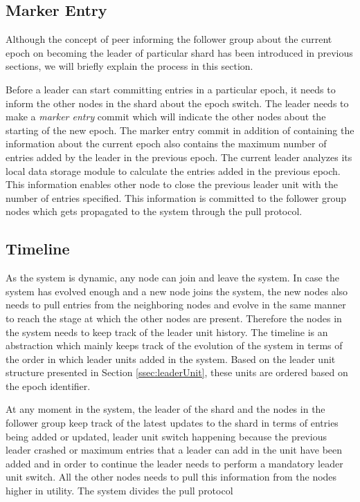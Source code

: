 \documentclass[12pt,a4paper,twoside,openright]{book}
\begin{document}
\subsection{Marker Entry}
Although the concept of peer informing the follower group about the current epoch on becoming the leader of particular shard has been introduced in previous sections, we will briefly explain the process in this section. 

\par Before a leader can start committing entries in a particular epoch, it needs to inform the other nodes in the shard about the epoch switch. The leader needs to make a \textit{marker entry} commit which will indicate the other nodes about the starting of the new epoch. The marker entry commit in addition of containing the information about the current epoch also contains the maximum number of entries added by the leader in the previous epoch. The current leader analyzes its local data storage module to calculate the entries added in the previous epoch. This information enables other node to close the previous leader unit with the number of entries specified. This information is committed to the follower group nodes which gets propagated to the system through the pull protocol.

\subsection{Timeline}
\label{ssec:timeline}
As the system is dynamic, any node can join and leave the system. In case the system has evolved enough and a new node joins the system, the new nodes also needs to pull entries from the neighboring nodes and evolve in the same manner to reach the stage at which the other nodes are present. Therefore the nodes in the system needs to keep track of the leader unit history. The timeline is an abstraction which mainly keeps track of the evolution of the system in terms of the order in which leader units added in the system. Based on the leader unit structure presented in Section \ref{ssec:leaderUnit}, these units are ordered based on the epoch identifier. 

\par At any moment in the system, the leader of the shard and the nodes in the follower group keep track of the latest updates to the shard in terms of entries being added or updated, leader unit switch happening because the previous leader crashed or maximum entries that a leader can add in the unit have been added and in order to continue the leader needs to perform a mandatory leader unit switch. All the other nodes needs to pull this information from the nodes higher in utility. The system divides the pull protocol 
\end{document}
